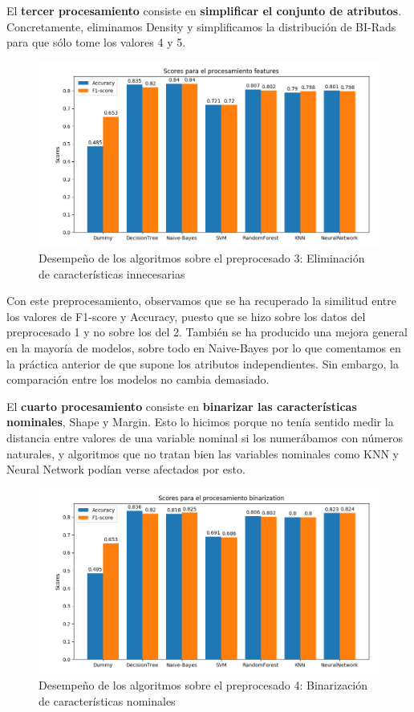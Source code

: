 \documentclass[oneside]{book}
\begin{document}
El \textbf{tercer procesamiento} consiste en \textbf{simplificar el
  conjunto de atributos}. Concretamente, eliminamos Density y
simplificamos la distribución de BI-Rads para que sólo tome los
valores 4 y 5.

\begin{figure}[H]
  \centering
  \label{fig:features}
  \caption{Desempeño de los algoritmos sobre el preprocesado 3: Eliminación de características innecesarias}
  \includegraphics[width=170mm]{figures/visualizacion/features}
\end{figure}

Con este preprocesamiento, observamos que se ha recuperado la
similitud entre los valores de F1-score y Accuracy, puesto que se hizo
sobre los datos del preprocesado 1 y no sobre los del 2. También se ha
producido una mejora general en la mayoría de modelos, sobre todo en
Naive-Bayes por lo que comentamos en la práctica anterior de que
supone los atributos independientes. Sin embargo, la comparación entre
los modelos no cambia demasiado.

El \textbf{cuarto procesamiento} consiste en \textbf{binarizar las
  características nominales}, Shape y Margin. Esto lo hicimos porque
no tenía sentido medir la distancia entre valores de una variable
nominal si los numerábamos con números naturales, y algoritmos que no
tratan bien las variables nominales como KNN y Neural Network podían
verse afectados por esto.

\begin{figure}[H]
  \centering
  \label{fig:binarization}
  \caption{Desempeño de los algoritmos sobre el preprocesado 4: Binarización de características nominales}
  \includegraphics[width=180mm]{figures/visualizacion/binarization}
\end{figure}
\end{document}
